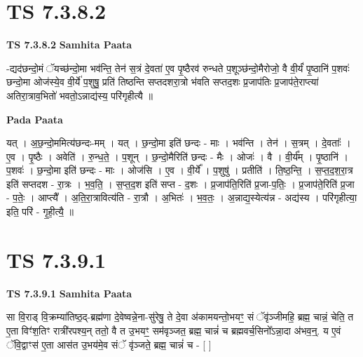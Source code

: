 \documentclass[17pt]{extarticle}
\begin{document}

\section{ TS 7.3.8.2 }

\textbf{TS 7.3.8.2 } \newline
\textbf{Samhita Paata} \newline

-द्यद॑छन्दो॒मं ॅयच्छ॑न्दो॒मा भव॑न्ति॒ तेन॑ स॒त्रं दे॒वता॑ ए॒व पृ॒ष्ठैरव॑ रुन्धते प॒शूञ्छ॑न्दो॒मैरोजो॒ वै वी॒र्यं॑ पृ॒ष्ठानि॑ प॒शवः॑ छन्दो॒मा ओज॑स्ये॒व वी॒र्ये॑ प॒शुषु॒ प्रति॑ तिष्ठन्ति सप्तदशरा॒त्रो भ॑वति सप्तद॒शः प्र॒जाप॑तिः प्र॒जाप॑ते॒राप्त्या॑ अतिरा॒त्राव॒भितो॑ भवतो॒ऽन्नाद्य॑स्य॒ परि॑गृहीत्यै ॥ \newline

\textbf{Pada Paata} \newline

यत् । अ॒छ॒न्दो॒ममित्य॑छन्दः-मम् । यत् । छ॒न्दो॒मा इति॑ छन्दः - माः । भव॑न्ति । तेन॑ । स॒त्रम् । दे॒वताः᳚ । ए॒व । पृ॒ष्ठैः । अवेति॑ । रु॒न्ध॒ते॒ । प॒शून् । छ॒न्दो॒मैरिति॑ छन्दः - मैः । ओजः॑ । वै । वी॒र्य᳚म् । पृ॒ष्ठानि॑ । प॒शवः॑ । छ॒न्दो॒मा इति॑ छन्दः - माः । ओज॑सि । ए॒व । वी॒र्ये᳚ । प॒शुषु॑ । प्रतीति॑ । ति॒ष्ठ॒न्ति॒ । स॒प्त॒द॒श॒रा॒त्र इति॑ सप्तदश - रा॒त्रः । भ॒व॒ति॒ । स॒प्त॒द॒श इति॑ सप्त - द॒शः । प्र॒जाप॑ति॒रिति॑ प्र॒जा-प॒तिः॒ । प्र॒जाप॑ते॒रिति॑ प्र॒जा - प॒तेः॒ । आप्त्यै᳚ । अ॒ति॒रा॒त्रावित्य॑ति - रा॒त्रौ । अ॒भितः॑ । भ॒व॒तः॒ । अ॒न्नाद्य॒स्येत्य॑न्न - अद्य॑स्य । परि॑गृहीत्या॒ इति॒ परि॑ - गृ॒ही॒त्यै॒ ॥  \newline





\section{ TS 7.3.9.1 }

\textbf{TS 7.3.9.1 } \newline
\textbf{Samhita Paata} \newline

सा वि॒राड् वि॒क्रम्या॑तिष्ठ॒द्-ब्रह्म॑णा दे॒वेष्वन्ने॒ना-सु॑रेषु॒ ते दे॒वा अ॑कामयन्तो॒भयꣳ॒॒ सं ॅवृ॑ञ्जीमहि॒ ब्रह्म॒ चान्नं॒ चेति॒ त ए॒ता विꣳ॑श॒तिꣳ रात्री॑रपश्य॒न् ततो॒ वै त उ॒भयꣳ॒॒ सम॑वृञ्जत॒ ब्रह्म॒ चान्नं॑ च ब्रह्मवर्च॒सिनो᳚ऽन्ना॒दा अ॑भव॒न्॒. य ए॒वं ॅवि॒द्वाꣳस॑ ए॒ता आस॑त उ॒भय॑मे॒व संॅ वृ॑ञ्जते॒ ब्रह्म॒ चान्नं॑ च - [  ] \newline
\end{document}
